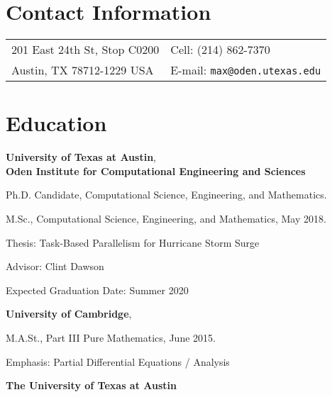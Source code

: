 \documentclass[margin,line]{res}
\newenvironment{list1}{
  \begin{list}{\ding{113}}{%
      \setlength{\itemsep}{0in}
      \setlength{\parsep}{0in} \setlength{\parskip}{0in}
      \setlength{\topsep}{0in} \setlength{\partopsep}{0in}
      \setlength{\leftmargin}{0.17in}}}{\end{list}}
\begin{document}
 

\begin{resume}

\section{\sc Contact Information} 
\begin{tabular}{@{}p{3.25in}p{4in}}
201 East 24th St, Stop C0200 & { Cell:} (214) 862-7370 \\
Austin, TX 78712-1229 USA & {E-mail:} {\tt max@oden.utexas.edu}
\end{tabular} 


\section{\sc Education} 

\textbf{University of Texas at Austin}, \\
\textbf{Oden Institute for Computational Engineering and Sciences} \\ 
\vspace*{-.1in} 

\begin{list1} 
\item[] Ph.D. Candidate, Computational Science, Engineering, and Mathematics.
\item[] M.Sc., Computational Science, Engineering, and Mathematics, May 2018.
\item[] Thesis: Task-Based Parallelism for Hurricane Storm Surge
\item[] Advisor: Clint Dawson
\item[] Expected Graduation Date: Summer 2020
\end{list1}

\textbf{University of Cambridge}, \\
\vspace*{-.1in}

\begin{list1}
\item[] M.A.St., Part III Pure Mathematics, June 2015.
\item[] Emphasis: Partial Differential Equations / Analysis
\end{list1}

\textbf{The University of Texas at Austin} \\


\end{resume}
\end{document}

